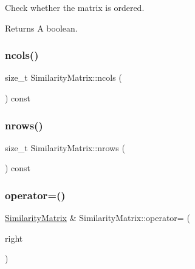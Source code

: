 Check whether the matrix is ordered.

\begin{DoxyReturn}{Returns}
A boolean. 
\end{DoxyReturn}
\mbox{\label{class_similarity_matrix_af06f9d9d8e531a72def89d65c44531a4}} 
\subsubsection{\texorpdfstring{ncols()}{ncols()}}
{\footnotesize\ttfamily size\+\_\+t Similarity\+Matrix\+::ncols (\begin{DoxyParamCaption}{ }\end{DoxyParamCaption}) const}

\mbox{\label{class_similarity_matrix_a1a52a99f25893158ac083816e1732718}} 
\subsubsection{\texorpdfstring{nrows()}{nrows()}}
{\footnotesize\ttfamily size\+\_\+t Similarity\+Matrix\+::nrows (\begin{DoxyParamCaption}{ }\end{DoxyParamCaption}) const}

\mbox{\label{class_similarity_matrix_a8481d69ccd6d4d240805e729375566b4}} 
\subsubsection{\texorpdfstring{operator=()}{operator=()}}
{\footnotesize\ttfamily \mbox{\hyperlink{class_similarity_matrix}{Similarity\+Matrix}} \& Similarity\+Matrix\+::operator= (\begin{DoxyParamCaption}\item[{const \mbox{\hyperlink{class_similarity_matrix}{Similarity\+Matrix}} \&}]{right }\end{DoxyParamCaption})}

\mbox{\label{class_similarity_matrix_af8aa5c9e5d71534dcd2fcdfb6029a2ef}} 
